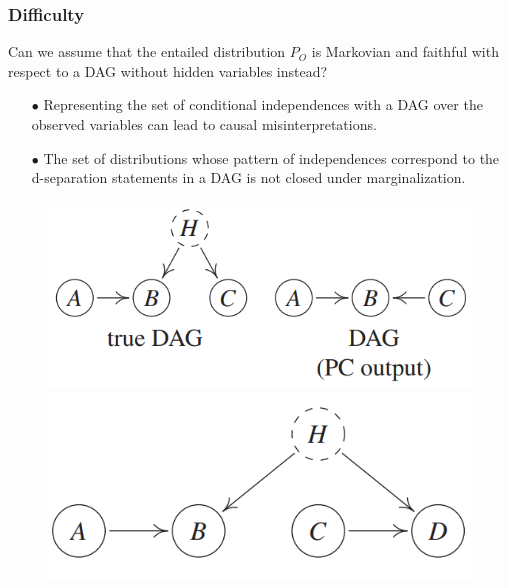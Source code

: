 \documentclass{beamer}
\begin{document}
\begin{frame}
    \frametitle{Difficulty}
    \begin{flushleft}
        Can we assume that the entailed distribution $P_O$
        is Markovian and faithful with respect to a DAG without hidden variables instead?
    \end{flushleft}
    \begin{itemize}
        \item[$\bullet$] Representing the set of conditional independences with a DAG over the 
        observed variables can lead to causal misinterpretations.
        \item[$\bullet$] The set of distributions whose pattern of independences correspond to the d-separation statements in
        a DAG is not closed under marginalization.
    \end{itemize}
    \begin{figure}[htbp]
        \centering
        \begin{minipage}[t]{0.48\textwidth}
        \centering
        \includegraphics[scale=0.6]{fig5.png}
        \end{minipage}
        \begin{minipage}[t]{0.48\textwidth}
        \centering
        \includegraphics[scale=0.6]{fig6.png}
        \end{minipage}
    \end{figure}
\end{frame}
\end{document}
